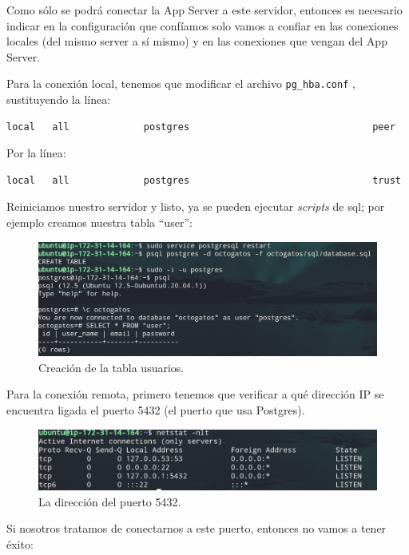 \documentclass{article}
\newcommand{\ttt}[1]{%
\texttt{#1}%
}
\begin{document}
Como sólo se podrá conectar la App Server a este servidor, 
entonces es necesario indicar en la configuración que 
confíamos solo vamos a confiar en las conexiones locales 
(del mismo server a sí mismo) y en las conexiones que vengan
del App Server.

Para la conexión local, tenemos que modificar el archivo 
\ttt{pg\_hba.conf}, sustituyendo la línea:

\begin{lstlisting}
local   all             postgres                                peer
\end{lstlisting}

Por la línea:
\begin{lstlisting}
local   all             postgres                                trust
\end{lstlisting}

Reiniciamos nuestro servidor y listo, ya se pueden ejecutar 
\textit{scripts} de sql; por ejemplo creamos nuestra tabla 
``user'':

\begin{figure}[H]
  \centering
  \includegraphics[width=\textwidth]{DATASERVER/exhibitE}
  \caption{Creación de la tabla usuarios.}
  \label{fig:DATASERVER-E}
\end{figure}

Para la conexión remota, primero tenemos que verificar a qué 
dirección IP se encuentra ligada el puerto 5432 (el puerto 
que usa Postgres).

\begin{figure}[H]
  \centering
  \includegraphics[width=\textwidth]{DATASERVER/exhibitF}
  \caption{La dirección del puerto 5432.}
  \label{fig:DATASERVER-E}
\end{figure}

Si nosotros tratamos de conectarnos a este puerto, entonces no 
vamos a tener éxito:
\end{document}
